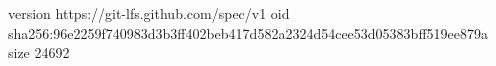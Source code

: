 version https://git-lfs.github.com/spec/v1
oid sha256:96e2259f740983d3b3ff402beb417d582a2324d54cee53d05383bff519ee879a
size 24692
